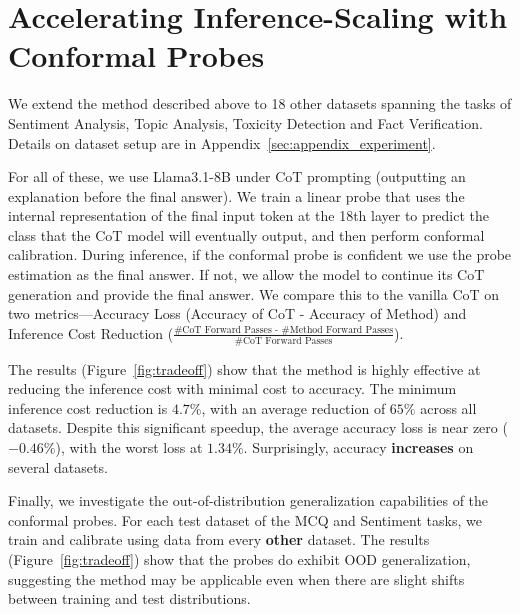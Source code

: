 \section{Accelerating Inference-Scaling with Conformal Probes}


We extend the method described above to 18 other datasets spanning the tasks of Sentiment Analysis, Topic Analysis, Toxicity Detection and Fact Verification. Details on dataset setup are in Appendix~\ref{sec:appendix_experiment}. 

For all of these, we use Llama3.1-8B under CoT prompting (outputting an explanation before the final answer). We train a linear probe that uses the internal representation of the final input token at the 18th layer to predict the class that the CoT model will eventually output, and then perform conformal calibration. During inference, if the conformal probe is confident we use the probe estimation as the final answer. If not, we allow the model to continue its CoT generation and provide the final answer. We compare this to the vanilla CoT on two metrics---Accuracy Loss (Accuracy of CoT - Accuracy of Method) and Inference Cost Reduction ($\frac{\#\text{CoT Forward Passes - \#Method Forward Passes}}{\text{\# CoT Forward Passes}}$). 

The results (Figure~\ref{fig:tradeoff}) show that the method is highly effective at reducing the inference cost with minimal cost to accuracy. The minimum inference cost reduction is $4.7\%$, with an average reduction of $65\%$ across all datasets. Despite this significant speedup, the average accuracy loss is near zero ($\mathbf{-0.46\%}$), with the worst loss at $1.34\%$. Surprisingly, accuracy \textbf{increases} on several datasets. 

Finally, we investigate the out-of-distribution generalization capabilities of the conformal probes. For each test dataset of the MCQ and Sentiment tasks, we train and calibrate using data from every \textbf{other} dataset. The results (Figure~\ref{fig:tradeoff}) show that the probes do exhibit OOD generalization, suggesting the method may be applicable even when there are slight shifts between training and test distributions.